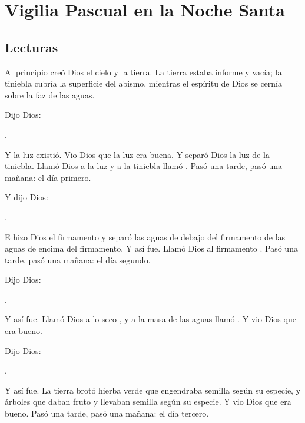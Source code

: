 \chapter{Vigilia Pascual en la Noche Santa}

\section{Lecturas}


 


\begin{scripture}
Al principio creó Dios el cielo y la tierra. La tierra estaba informe y vacía; la tiniebla cubría la superficie del abismo, mientras el espíritu de Dios se cernía sobre la faz de las aguas. 

Dijo Dios: 

.

Y la luz existió. Vio Dios que la luz era buena. Y separó Dios la luz de la tiniebla. Llamó Dios a la luz  y a la tiniebla llamó . Pasó una tarde, pasó una mañana: el día primero. 

Y dijo Dios: 

.

E hizo Dios el firmamento y separó las aguas de debajo del firmamento de las aguas de encima del firmamento. Y así fue. Llamó Dios al firmamento . Pasó una tarde, pasó una mañana: el día segundo. 

Dijo Dios: 

.

Y así fue. Llamó Dios a lo seco , y a la masa de las aguas llamó . Y vio Dios que era bueno. 

Dijo Dios: 

.

Y así fue. La tierra brotó hierba verde que engendraba semilla según su especie, y árboles que daban fruto y llevaban semilla según su especie. Y vio Dios que era bueno. Pasó una tarde, pasó una mañana: el día tercero. 


\end{scripture}
